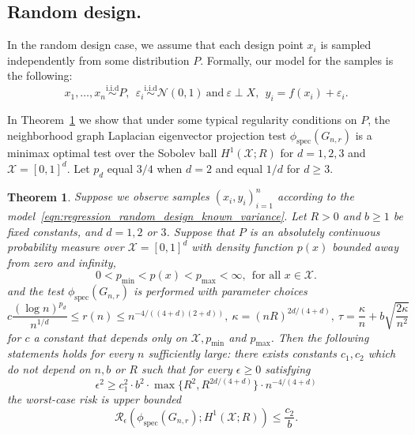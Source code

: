 \documentclass{article}
\newcommand{\1}{\mathbf{1}}
\newcommand{\Xset}{\mathcal{X}}
\newcommand{\spec}{\mathrm{spec}}
\theoremstyle{alden}
\theoremstyle{aldenthm}
\newtheorem{theorem}{Theorem}
\theoremstyle{definition}
\theoremstyle{remark}
\begin{document}
\subsection{Random design.}
In the random design case, we assume that each design point $x_i$ is sampled independently from some distribution $P$. Formally, our model for the samples is the following:
\begin{equation}
\label{eqn:regression_random_design_known_variance}
x_1,\ldots,x_n \overset{\textrm{i.i.d}}{\sim} P,~~ \varepsilon_i \overset{\textrm{i.i.d}}{\sim} \mathcal{N}(0,1)~\textrm{and}~ \varepsilon \perp X,~~ y_i = f(x_i) + \varepsilon_i.
\end{equation}

In Theorem~\ref{thm:sobolev_testing_rate_order1} we show that under some typical regularity conditions on $P$, the neighborhood graph Laplacian eigenvector projection test $\phi_{\textrm{spec}}(G_{n,r})$ is a minimax optimal test over the Sobolev ball $H^1(\mathcal{X};R)$ for $d = 1,2,3$ and $\Xset = [0,1]^d$. Let $p_d$ equal $3/4$ when $d = 2$ and equal $1/d$ for $d \geq 3$.

\begin{theorem}
	\label{thm:sobolev_testing_rate_order1}
	Suppose we observe samples $(x_i,y_i)_{i = 1}^{n}$ according to the model~\eqref{eqn:regression_random_design_known_variance}. Let $R > 0$ and $b \geq 1$ be fixed constants, and $d = 1,2$ or $3$. Suppose that $P$ is an absolutely continuous probability measure over $\mathcal{X} = [0,1]^d$ with density function $p(x)$ bounded away from zero and infinity, 
	\begin{equation*}
	0 < p_{\min} < p(x) < p_{\max} < \infty,~~ \textrm{for all $x \in \mathcal{X}$.}
	\end{equation*}
	and the test $\phi_{\spec}(G_{n,r})$ is performed with parameter choices
	\begin{equation*}
	c \frac{(\log n)^{p_d}}{n^{1/d}} \leq r(n) \leq n^{-4/((4 + d)(2+d))}, ~\kappa = (nR)^{2d/(4 + d)}, ~\tau = \frac{\kappa}{n} + b\sqrt{\frac{2\kappa}{n^2}}
	\end{equation*}
	for $c$ a constant that depends only on $\Xset, p_{\min}$ and $p_{\max}$. Then the following statements holds for every $n$ sufficiently large: there exists constants $c_1,c_2$ which do not depend on $n,b$ or $R$ such that for every $\epsilon \geq 0$ satisfying
	\begin{equation}
	\label{eqn:sobolev_testing_rate_order1}
	\epsilon^2 \geq c_1^2 \cdot b^2 \cdot \max\{R^2,R^{2d/(4 + d)}\} \cdot n^{-4/(4 + d)}
	\end{equation}
	the worst-case risk is upper bounded
	\begin{equation}
	\label{eqn:sobolev_testing_rate_order1_1}
	\mathcal{R}_{\epsilon}(\phi_{\mathrm{spec}}(G_{n,r}); H^1(\mathcal{X};R)) \leq \frac{c_2}{b}.
	\end{equation}
\end{theorem}
\end{document}

